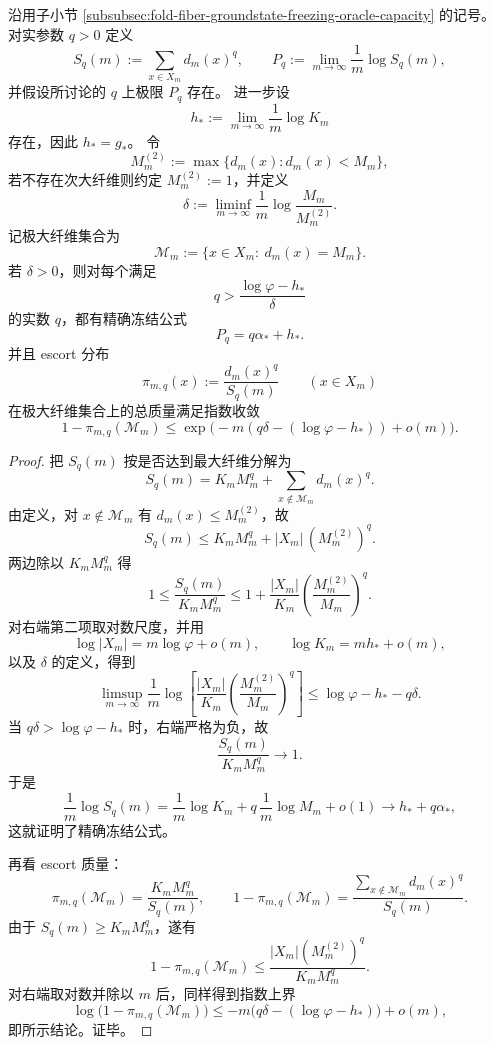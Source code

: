 \begin{theorem}[折叠多重度压力谱的精确冻结阈值]\label{thm:fold-pressure-exact-freezing-gap-threshold}
沿用子小节 \ref{subsubsec:fold-fiber-groundstate-freezing-oracle-capacity} 的记号。
对实参数 \(q>0\) 定义
\[
S_q(m):=\sum_{x\in X_m} d_m(x)^q,
\qquad
P_q:=\lim_{m\to\infty}\frac1m\log S_q(m),
\]
并假设所讨论的 \(q\) 上极限 \(P_q\) 存在。
进一步设
\[
h_*:=\lim_{m\to\infty}\frac1m\log K_m
\]
存在，因此 \(h_*=g_*\)。
令
\[
M_m^{(2)}:=\max\{d_m(x): d_m(x)<M_m\},
\]
若不存在次大纤维则约定 \(M_m^{(2)}:=1\)，并定义
\[
\delta:=\liminf_{m\to\infty}\frac1m\log\frac{M_m}{M_m^{(2)}}.
\]
记极大纤维集合为
\[
\mathcal M_m:=\{x\in X_m:\ d_m(x)=M_m\}.
\]
若 \(\delta>0\)，则对每个满足
\[
q>\frac{\log\varphi-h_*}{\delta}
\]
的实数 \(q\)，都有精确冻结公式
\[
\boxed{\;
P_q=q\alpha_*+h_*.\;}
\]
并且 escort 分布
\[
\pi_{m,q}(x):=\frac{d_m(x)^q}{S_q(m)}
\qquad(x\in X_m)
\]
在极大纤维集合上的总质量满足指数收敛
\[
\boxed{\;
1-\pi_{m,q}(\mathcal M_m)
\le
\exp\!\bigl(-m(q\delta-(\log\varphi-h_*))+o(m)\bigr).\;}
\]
\end{theorem}
\begin{proof}
把 \(S_q(m)\) 按是否达到最大纤维分解为
\[
S_q(m)=K_mM_m^q+\sum_{x\notin\mathcal M_m}d_m(x)^q.
\]
由定义，对 \(x\notin\mathcal M_m\) 有 \(d_m(x)\le M_m^{(2)}\)，故
\[
S_q(m)\le K_mM_m^q+|X_m|\,(M_m^{(2)})^q.
\]
两边除以 \(K_mM_m^q\) 得
\[
1\le \frac{S_q(m)}{K_mM_m^q}
\le
1+\frac{|X_m|}{K_m}\left(\frac{M_m^{(2)}}{M_m}\right)^q.
\]
对右端第二项取对数尺度，并用
\[
\log|X_m|=m\log\varphi+o(m),
\qquad
\log K_m=mh_*+o(m),
\]
以及 \(\delta\) 的定义，得到
\[
\limsup_{m\to\infty}\frac1m
\log\!\left[
\frac{|X_m|}{K_m}\left(\frac{M_m^{(2)}}{M_m}\right)^q
\right]
\le
\log\varphi-h_*-q\delta.
\]
当 \(q\delta>\log\varphi-h_*\) 时，右端严格为负，故
\[
\frac{S_q(m)}{K_mM_m^q}\to 1.
\]
于是
\[
\frac1m\log S_q(m)
=
\frac1m\log K_m+q\,\frac1m\log M_m+o(1)
\to
h_*+q\alpha_*,
\]
这就证明了精确冻结公式。

再看 escort 质量：
\[
\pi_{m,q}(\mathcal M_m)=\frac{K_mM_m^q}{S_q(m)},
\qquad
1-\pi_{m,q}(\mathcal M_m)
=
\frac{\sum_{x\notin\mathcal M_m}d_m(x)^q}{S_q(m)}.
\]
由于 \(S_q(m)\ge K_mM_m^q\)，遂有
\[
1-\pi_{m,q}(\mathcal M_m)
\le
\frac{|X_m|(M_m^{(2)})^q}{K_mM_m^q}.
\]
对右端取对数并除以 \(m\) 后，同样得到指数上界
\[
\log\!\bigl(1-\pi_{m,q}(\mathcal M_m)\bigr)
\le
-m\bigl(q\delta-(\log\varphi-h_*)\bigr)+o(m),
\]
即所示结论。证毕。
\end{proof}

\endinput
